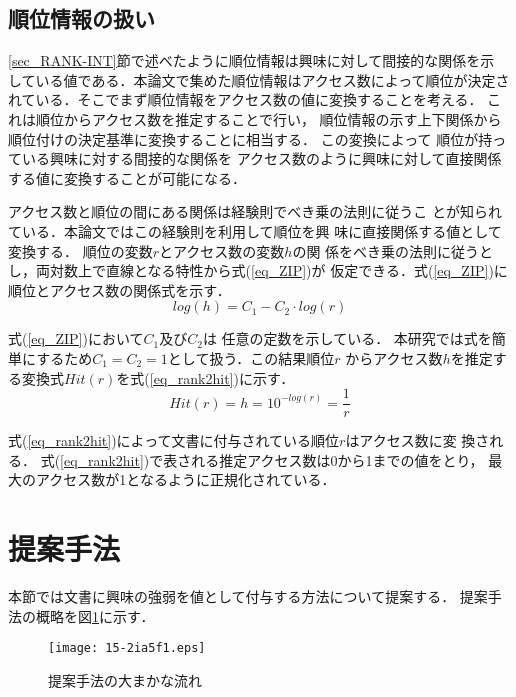 \documentclass[japanese]{jnlp_1.4}
\begin{document}
\subsection{順位情報の扱い}

\ref{sec_RANK-INT}節で述べたように順位情報は興味に対して間接的な関係を示
している値である．本論文で集めた順位情報はアクセス数によって順位が決定さ
れている．そこでまず順位情報をアクセス数の値に変換することを考える．
これは順位からアクセス数を推定することで行い，
順位情報の示す上下関係から順位付けの決定基準に変換することに相当する．
この変換によって
順位が持っている興味に対する間接的な関係を
アクセス数のように興味に対して直接関係する値に変換することが可能になる．


アクセス数と順位の間にある関係は経験則でべき乗の法則に従うこ
とが知られている\cite{lada2002}．本論文ではこの経験則を利用して順位を興
味に直接関係する値として変換する．
順位の変数$r$とアクセス数の変数$h$の関
係をべき乗の法則に従うとし，両対数上で直線となる特性から式(\ref{eq_ZIP})が
仮定できる．式(\ref{eq_ZIP})に順位とアクセス数の関係式を示す．
\begin{equation} \label{eq_ZIP}
 \mathit{log}(h) = C_{1} - C_{2} \cdot log(r)
\end{equation}


式(\ref{eq_ZIP})において$C_{1}$及び$C_{2}$は
任意の定数を示している．
本研究では式を簡単にするため$C_{1}=C_{2}=1$として扱う．この結果順位$r$
からアクセス数$h$を推定する変換式$Hit(r)$を式(\ref{eq_rank2hit})に示す．
\begin{equation} \label{eq_rank2hit}
 \mathit{Hit}(r) = h = 10^{-log(r)} = \frac{1}{r} 
\end{equation}

式(\ref{eq_rank2hit})によって文書に付与されている順位$r$はアクセス数に変
換される．
式(\ref{eq_rank2hit})で表される推定アクセス数は0から1までの値をとり，
最大のアクセス数が1となるように正規化されている．



\section{提案手法}\label{sec_method}
本節では文書に興味の強弱を値として付与する方法について提案する．
提案手法の概略を図\ref{flow}に示す．

\begin{figure}[b]
\begin{center}
\texttt{[image: 15-2ia5f1.eps]}
\end{center}
\caption{提案手法の大まかな流れ}
\label{flow}
\end{figure}
\end{document}
